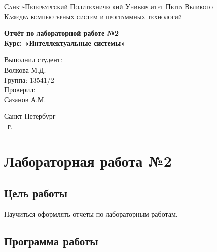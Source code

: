 \documentclass[14pt,a4paper,report]{report}
\begin{document}
\def\contentsname{Содержание}

\begin{titlepage}
\begin{center}
\textsc{Санкт-Петербургский Политехнический 
Университет Петра Великого\\[5mm]
Кафедра компьютерных систем и программных технологий}

\vfill

\textbf{Отчёт по лабораторной работе №2\\[3mm]
Курс: «Интеллектуальные системы»\\[41mm]
}
\end{center}

\hfill
\begin{minipage}{.4\textwidth}
Выполнил студент:\\[2mm] 
Волкова М.Д.\\
Группа: 13541/2\\[5mm]

Проверил:\\[2mm] 
Сазанов А.М.
\end{minipage}
\vfill
\begin{center}
Санкт-Петербург\\ \the\year\ г.
\end{center}
\end{titlepage}

\tableofcontents
\clearpage

\chapter{Лабораторная работа №2}

\section{Цель работы}

Научиться оформлять отчеты по лабораторным работам.

\section{Программа работы}
\end{document}
